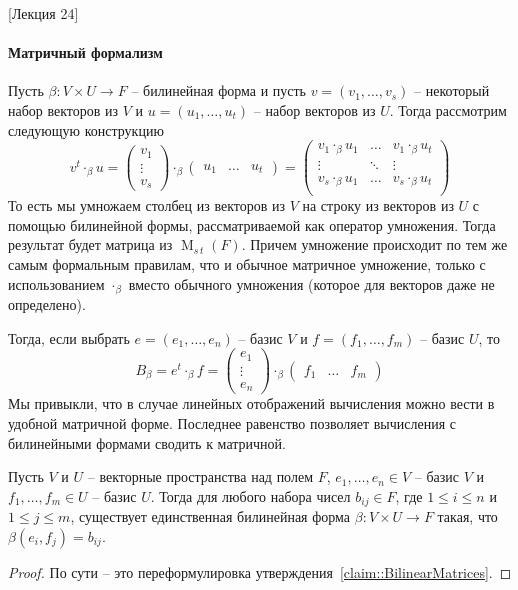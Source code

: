 [Лекция 24]


\paragraph{Матричный формализм}

Пусть $\beta\colon V\times U\to F$ -- билинейная форма и пусть $v = (v_1,\ldots,v_s)$ -- некоторый набор векторов из $V$ и $u = (u_1,\ldots,u_t)$ -- набор векторов из $U$.
Тогда рассмотрим следующую конструкцию
\[
v^t\cdot_\beta u = 
\begin{pmatrix}
{v_1}\\{\vdots}\\{v_s}
\end{pmatrix}
\cdot_\beta
\begin{pmatrix}
{u_1}&{\ldots}&{u_t}
\end{pmatrix}
=
\begin{pmatrix}
{v_1\cdot_\beta u_1}&{\ldots}&{v_1\cdot_\beta u_t}\\
{\vdots}&{\ddots}&{\vdots}\\
{v_s\cdot_\beta u_1}&{\ldots}&{v_s\cdot_\beta u_t}\\
\end{pmatrix}
\]
То есть мы умножаем столбец из векторов из $V$ на строку из векторов из $U$ с помощью билинейной формы, рассматриваемой как оператор умножения.
Тогда результат будет матрица из $\operatorname{M}_{s\,t}(F)$.
Причем умножение происходит по тем же самым формальным правилам, что и обычное матричное умножение, только с использованием $\cdot_\beta$ вместо обычного умножения (которое для векторов даже не определено).

Тогда, если выбрать $e = (e_1,\ldots,e_n)$ -- базис $V$ и $f = (f_1,\ldots,f_m)$ -- базис $U$, то 
\[
B_\beta = e^t\cdot_\beta f = 
\begin{pmatrix}
{e_1}\\{\vdots}\\{e_n}
\end{pmatrix}
\cdot_\beta
\begin{pmatrix}
{f_1}&{\ldots}&{f_m}
\end{pmatrix}
\]
Мы привыкли, что в случае линейных отображений вычисления можно вести в удобной матричной форме.
Последнее равенство позволяет вычисления с билинейными формами сводить к матричной.

\begin{claim}
Пусть $V$ и $U$ -- векторные пространства над полем $F$, $e_1,\ldots,e_n \in V$ -- базис $V$ и $f_1,\ldots,f_m\in U$ -- базис $U$.
Тогда для любого набора чисел $b_{ij}\in F$, где $1\leqslant i \leqslant n$ и $1\leqslant j \leqslant m$, существует единственная билинейная форма $\beta\colon V\times U\to F$ такая, что $\beta(e_i,f_j) = b_{ij}$.
\end{claim}
\begin{proof}
По сути -- это переформулировка утверждения~\ref{claim::BilinearMatrices}.
\end{proof}

